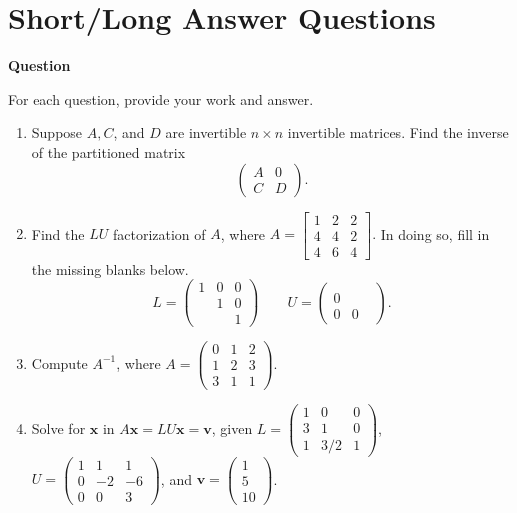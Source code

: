 \documentclass[10pt, titlepage]{article}
\newcounter{question}
\newenvironment{newquestion}
{
	\noindent\textbf{Question \thequestion}
}
{
\stepcounter{question}
\par
}
\renewcommand{\vec}[1]{\bm{#1}}
\begin{document}
\section{\centering Short/Long Answer Questions}
\begin{newquestion}
	For each question, provide your work and answer.
	\begin{enumerate}
		\item Suppose \(A, C\), and \(D\) are invertible \(n \times n\) invertible matrices. Find the inverse of the partitioned matrix 
			\[\begin{pmatrix}A & 0 \\ C & D\end{pmatrix}.\] 

		\item Find the \(LU\) factorization of \(A\), where \(A=\begin{bmatrix}1 & 2 & 2 \\ 4 & 4 & 2 \\ 4 & 6 & 4\end{bmatrix}.\) In doing so, fill in the missing
			blanks below. \[L = \begin{pmatrix}1 & 0 & 0 \\ & 1 & 0 \\ & & 1\end{pmatrix} \qquad U = \begin{pmatrix}& & \\ 0  & & \\ 0 & 0 & \end{pmatrix}.\]
		\item Compute \(A^{-1}\), where \(A = \begin{pmatrix}0 & 1 & 2 \\ 1 & 2 & 3 \\ 3 & 1 & 1\end{pmatrix}\).
		\item Solve for \(\vec{x}\) in \(A\vec{x} = LU\vec{x} = \vec{v}\), given \(L = \begin{pmatrix}1 & 0 & 0 \\ 3 &  1 & 0 \\ 1 & 3/2 & 1\end{pmatrix}\), 
			\(U = \begin{pmatrix}1 & 1 & 1\\ 0 & -2 & -6 \\ 0 & 0 &3\end{pmatrix}\), and \(\vec{v} = \begin{pmatrix}1 \\ 5 \\ 10\end{pmatrix}\).

\end{enumerate}
\end{newquestion}
\end{document}
